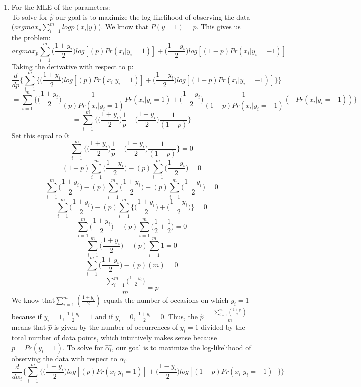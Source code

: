 \documentclass[english]{article}
\begin{document}
\begin{enumerate}
\item  For the MLE of the parameters:\\
To solve for $\hat{p}$ our goal is to maximize the log-likelihood of observing the data ($argmax_{p} \sum_{i=1}^{m} log p (x_i | y)$). We know that $P(y=1) = p$. This gives us the problem:
$$argmax_{p} \sum_{i=1}^{m} \bigg(\frac{1 + y_i}{2}\bigg)log[(p)Pr(x_i|y_i = 1)] + \bigg(\frac{1 - y_i}{2}\bigg)log[(1-p)Pr(x_i|y_i = -1)]$$
Taking the derivative with respect to p:
$$\frac{d}{dp} \bigg\{\sum_{i=1}^{m}\bigg\{ \bigg(\frac{1 + y_i}{2}\bigg)log[(p)Pr(x_i|y_i = 1)] + \bigg(\frac{1 - y_i}{2}\bigg)log[(1-p)Pr(x_i|y_i = -1)]\bigg\}\bigg\}$$
$$= \sum_{i=1}^{m} \bigg\{ \bigg(\frac{1 + y_i}{2}\bigg)\frac{1}{(p)Pr(x_i|y_i = 1)}Pr(x_i|y_i = 1) + \bigg(\frac{1 - y_i}{2}\bigg) \frac{1}{(1-p)Pr(x_i|y_i = -1)}(-Pr(x_i|y_i = -1)) \bigg\}$$
$$= \sum_{i=1}^{m} \bigg\{ \bigg(\frac{1 + y_i}{2}\bigg)\frac{1}{p} - \bigg(\frac{1 - y_i}{2}\bigg) \frac{1}{(1-p)} \bigg\}$$
Set this equal to $0$:
$$\sum_{i=1}^{m} \bigg\{ \bigg(\frac{1 + y_i}{2}\bigg)\frac{1}{p} - \bigg(\frac{1 - y_i}{2}\bigg) \frac{1}{(1-p)} \bigg\} = 0$$
$$(1-p)\sum_{i=1}^{m} \bigg(\frac{1 + y_i}{2}\bigg) - (p) \sum_{i=1}^{m} \bigg(\frac{1 - y_i}{2}\bigg) = 0$$
$$\sum_{i=1}^{m} \bigg(\frac{1 + y_i}{2}\bigg) - (p)\sum_{i=1}^{m} \bigg(\frac{1 + y_i}{2}\bigg) - (p) \sum_{i=1}^{m} \bigg(\frac{1 - y_i}{2}\bigg) = 0$$
$$\sum_{i=1}^{m} \bigg(\frac{1 + y_i}{2}\bigg) - (p)\sum_{i=1}^{m} \bigg\{ \bigg(\frac{1 + y_i}{2}\bigg) + \bigg(\frac{1 - y_i}{2}\bigg)\bigg\} = 0$$
$$\sum_{i=1}^{m} \bigg(\frac{1 + y_i}{2}\bigg) - (p)\sum_{i=1}^{m} \bigg(\frac{1}{2} + \frac{1}{2}\bigg) = 0$$
$$\sum_{i=1}^{m} \bigg(\frac{1 + y_i}{2}\bigg) - (p)\sum_{i=1}^{m} 1 = 0$$
$$\sum_{i=1}^{m} \bigg(\frac{1 + y_i}{2}\bigg) - (p)(m) = 0$$
$$\frac{\sum_{i=1}^{m} \bigg(\frac{1 + y_i}{2}\bigg)}{m} = p$$
We know that$\sum_{i=1}^{m} (\frac{1 + y_i}{2})$ equals the number of occasions on which $y_i = 1$ because if $y_i=1$, $\frac{1 + y_i}{2} =1$ and if $y_i = 0$, $\frac{1 + y_i}{2} = 0$. Thus, the $\hat{p} = \frac{\sum_{i=1}^{m} (\frac{1 + y_i}{2})}{m}$ means that $\hat{p}$ is given by the number of occurrences of $y_i = 1$ divided by the total number of data points, which intuitively makes sense because $p = Pr(y_i = 1)$. \newline\newline
To solve for $\hat{\alpha_i}$, our goal is to maximize the log-likelihood of observing the data with respect to $\alpha_i$. 
$$\frac{d}{d\alpha_i} \bigg\{\sum_{i=1}^{m} \bigg\{ \bigg(\frac{1 + y_i}{2}\bigg)log[(p)Pr(x_i|y_i = 1)] + \bigg(\frac{1 - y_i}{2}\bigg)log[(1-p)Pr(x_i|y_i = -1)]\bigg\} \bigg\}$$


\end{enumerate}
\end{document}
